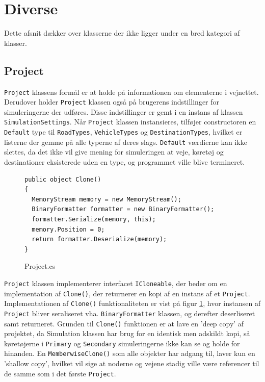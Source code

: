 \section{Diverse}\label{Diverse}
Dette afsnit dækker over klasserne der ikke ligger under en bred kategori af klasser.

\subsection{Project}
\texttt{Project} klassens formål er at holde på informationen om elementerne i vejnettet. Derudover holder \texttt{Project} klassen også på brugerens indstillinger for simuleringerne der udføres. Disse indstillinger er gemt i en instans af klassen \texttt{SimulationSettings}. Når \texttt{Project} klassen instansieres, tilføjer constructoren en \texttt{Default} type til \texttt{RoadTypes}, \texttt{VehicleTypes} og \texttt{DestinationTypes}, hvilket er listerne der gemme på alle typerne af deres slags. \texttt{Default} værdierne kan ikke slettes, da det ikke vil give mening for simuleringen at veje, køretøj og destinationer eksisterede uden en type, og programmet ville blive termineret. 

\begin{figure}[H]
\begin{lstlisting} 
public object Clone()
{
  MemoryStream memory = new MemoryStream();
  BinaryFormatter formatter = new BinaryFormatter();
  formatter.Serialize(memory, this);
  memory.Position = 0;
  return formatter.Deserialize(memory);
}
\end{lstlisting}
\caption{Project.cs}\label{Project}
\end{figure}

\texttt{Project} klassen implementerer interfacet \texttt{ICloneable}, der beder om en implementation af \texttt{Clone()}, der returnerer en kopi af en instans af et \texttt{Project}. Implementationen af \texttt{Clone()} funktionaliteten er vist på figur \ref{Project}, hvor instansen af \texttt{Project} bliver seraliseret vha. \texttt{BinaryFormatter} klassen, og derefter deserliseret samt returneret. Grunden til \texttt{Clone()} funktionen er at lave en 'deep copy' af projektet, da Simulation klassen har brug for en identisk men adskildt kopi, så køretøjerne i \texttt{Primary} og \texttt{Secondary} simuleringerne ikke kan se og holde for hinanden. En \texttt{MemberwiseClone()} som alle objekter har adgang til, laver kun en 'shallow copy', hvilket vil sige at noderne og vejene stadig ville være referencer til de samme som i det første \texttt{Project}.

